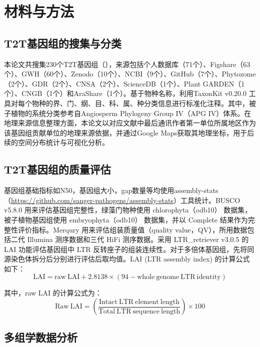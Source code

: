 \section{材料与方法}

\subsection{T2T基因组的搜集与分类}

本论文共搜集230个T2T基因组（），来源包括个人数据库（71个）、Figshare（63个）、GWH（60个）、Zenodo（10个）、NCBI（9个）、GitHub（7个）、Phytozome（2个）、GDR（2个）、CNSA（2个）、ScienceDB（1个）、Plant GARDEN（1个）、CNGB（1个）和AraShare（1个）。基于物种名称，利用TaxonKit v0.20.0 工具对每个物种的界、门、纲、目、科、属、种分类信息进行标准化注释\cite{shen2021taxonkit}。其中，被子植物的系统分类参考自Angiosperm Phylogeny Group IV（APG IV）体系\cite{angiosperm2016update}。在地理来源信息整理方面，本论文以对应文献中最后通讯作者第一单位所属地区作为该基因组贡献单位的地理来源依据，并通过Google Maps获取其地理坐标，用于后续的空间分布统计与可视化分析。


\subsection{T2T基因组的质量评估}

基因组基础指标如N50，基因组大小，gap数量等均使用assembly-stats（\url{https://github.com/sanger-pathogens/assembly-stats}）工具统计。BUSCO v5.8.0 用来评估基因组完整性\cite{manni2021busco}，绿藻门物种使用 chlorophyta（odb10） 数据集，被子植物基因组使用 embryophyta（odb10） 数据集，并以 Complete 结果作为完整性评价指标。Merqury 用来评估组装质量值（quality value，QV）\cite{rhie2020merqury}，所用数据包括二代 Illumina 测序数据和三代 HiFi 测序数据。采用 LTR\_retriever v3.0.5 的 LAI 功能评估基因组中 LTR 反转座子的组装连续性\cite{ou2018assessing}。对于多倍体基因组，先将同源染色体拆分后分别进行评估后取均值。LAI (LTR assembly index) 的计算公式如下：
\[
\mathrm{LAI} = \mathrm{raw\ LAI} + 2.8138 \times (94 - \mathrm{whole\ genome\ LTR\ identity})
\]

其中，raw LAI 的计算公式为：
\[
\mathrm{Raw\ LAI} = \left(\frac{\mathrm{Intact\ LTR\ element\ length}}{\mathrm{Total\ LTR\ sequence\ length}}\right)\times 100
\]

\subsection{多组学数据分析}

